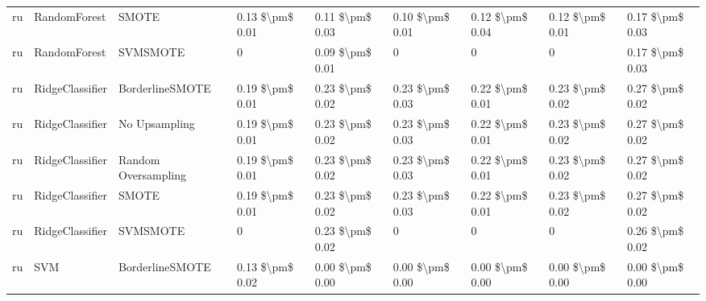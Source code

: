 \begin{tabular}{lllllllll}
      ru &                    RandomForest &                         SMOTE &     0.13 \$\textbackslash pm\$ 0.01 &           0.11 \$\textbackslash pm\$ 0.03 &       0.10 \$\textbackslash pm\$ 0.01 &        0.12 \$\textbackslash pm\$ 0.04 &                         0.12 \$\textbackslash pm\$ 0.01 &     0.17 \$\textbackslash pm\$ 0.03 \\
      ru &                    RandomForest &                      SVMSMOTE &                   0 &           0.09 \$\textbackslash pm\$ 0.01 &                     0 &                      0 &                                       0 &     0.17 \$\textbackslash pm\$ 0.03 \\
      ru &                 RidgeClassifier &               BorderlineSMOTE &     0.19 \$\textbackslash pm\$ 0.01 &           0.23 \$\textbackslash pm\$ 0.02 &       0.23 \$\textbackslash pm\$ 0.03 &        0.22 \$\textbackslash pm\$ 0.01 &                         0.23 \$\textbackslash pm\$ 0.02 &     0.27 \$\textbackslash pm\$ 0.02 \\
      ru &                 RidgeClassifier &                 No Upsampling &     0.19 \$\textbackslash pm\$ 0.01 &           0.23 \$\textbackslash pm\$ 0.02 &       0.23 \$\textbackslash pm\$ 0.03 &        0.22 \$\textbackslash pm\$ 0.01 &                         0.23 \$\textbackslash pm\$ 0.02 &     0.27 \$\textbackslash pm\$ 0.02 \\
      ru &                 RidgeClassifier &           Random Oversampling &     0.19 \$\textbackslash pm\$ 0.01 &           0.23 \$\textbackslash pm\$ 0.02 &       0.23 \$\textbackslash pm\$ 0.03 &        0.22 \$\textbackslash pm\$ 0.01 &                         0.23 \$\textbackslash pm\$ 0.02 &     0.27 \$\textbackslash pm\$ 0.02 \\
      ru &                 RidgeClassifier &                         SMOTE &     0.19 \$\textbackslash pm\$ 0.01 &           0.23 \$\textbackslash pm\$ 0.02 &       0.23 \$\textbackslash pm\$ 0.03 &        0.22 \$\textbackslash pm\$ 0.01 &                         0.23 \$\textbackslash pm\$ 0.02 &     0.27 \$\textbackslash pm\$ 0.02 \\
      ru &                 RidgeClassifier &                      SVMSMOTE &                   0 &           0.23 \$\textbackslash pm\$ 0.02 &                     0 &                      0 &                                       0 &     0.26 \$\textbackslash pm\$ 0.02 \\
      ru &                             SVM &               BorderlineSMOTE &     0.13 \$\textbackslash pm\$ 0.02 &           0.00 \$\textbackslash pm\$ 0.00 &       0.00 \$\textbackslash pm\$ 0.00 &        0.00 \$\textbackslash pm\$ 0.00 &                         0.00 \$\textbackslash pm\$ 0.00 &     0.00 \$\textbackslash pm\$ 0.00 \\

\end{tabular}
